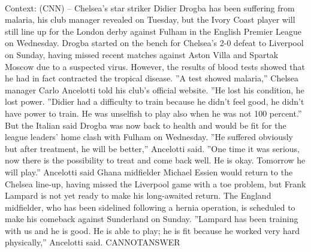 \documentclass[11pt,a4paper, onecolumn]{article}
\begin{document}
\\ Context: (CNN) -- Chelsea's star striker Didier Drogba has been suffering from malaria, his club manager revealed on Tuesday, but the Ivory Coast player will still line up for the London derby against Fulham in the English Premier League on Wednesday. Drogba started on the bench for Chelsea's 2-0 defeat to Liverpool on Sunday, having missed recent matches against Aston Villa and Spartak Moscow due to a suspected virus. However, the results of blood tests showed that he had in fact contracted the tropical disease. ''A test showed malaria,'' Chelsea manager Carlo Ancelotti told his club's official website. ''He lost his condition, he lost power. ''Didier had a difficulty to train because he didn't feel good, he didn't have power to train. He was unselfish to play also when he was not 100 percent.'' But the Italian said Drogba was now back to health and would be fit for the league leaders' home clash with Fulham on Wednesday. ''He suffered obviously but after treatment, he will be better,'' Ancelotti said. ''One time it was serious, now there is the possibility to treat and come back well. He is okay. Tomorrow he will play.'' Ancelotti said Ghana midfielder Michael Essien would return to the Chelsea line-up, having missed the Liverpool game with a toe problem, but Frank Lampard is not yet ready to make his long-awaited return. The England midfielder, who has been sidelined following a hernia operation, is scheduled to make his comeback against Sunderland on Sunday. ''Lampard has been training with us and he is good. He is able to play; he is fit because he worked very hard physically,'' Ancelotti said. CANNOTANSWER
\end{document}
